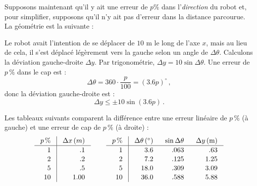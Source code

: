 {Supposons maintenant qu'il y ait une erreur de $p\%$ dans l'\emph{direction} du robot et, pour simplifier, supposons qu'il n'y ait pas d'erreur dans la distance parcourue. La géométrie est la suivante :

\begin{center}
\end{center}

Le robot avait l'intention de se déplacer de $10$ m le long de l'axe $x$, mais au lieu de cela, il s'est déplacé légèrement vers la gauche selon un angle de $\Delta \theta$. Calculons la déviation gauche-droite $\Delta y$. Par trigonométrie, $\Delta y = 10\sin \Delta\theta$. Une erreur de $p\,\%$ dans le cap est :
\[
\Delta\theta=360\cdot\frac{p}{100}=(3.6p)^\circ\,,
\]
donc la déviation gauche-droite est :
\[
\Delta y \leq \pm 10 \sin (3.6p)\,.
\]

Les tableaux suivants comparent la différence entre une erreur linéaire de $p\,\%$ (à gauche) et une erreur de cap de $p\,\%$ (à droite) :
\begin{displaymath}
\setlength{\arraycolsep}{2ex}
\renewcommand{\arraystretch}{1.1}
\begin{array}{r|r}
\multicolumn{1}{c|}{p\,\%} & \multicolumn{1}{c}{\Delta x \,(m)}\\\hline
1 & .1 \\
2 & .2 \\
5 & .5 \\
10 & 1.00\\
\end{array}
\;\;\;\;\;\;\;\;
\begin{array}{r|rrr}
\multicolumn{1}{c|}{p\,\%} & \multicolumn{1}{c}{\Delta \theta\,({}^\circ)} & \multicolumn{1}{c}{\sin\Delta\theta} & \multicolumn{1}{c}{\Delta y \,(\textrm{m})}\\\hline
1 & 3.6 & .063 & .63\\
2 & 7.2 & .125 & 1.25\\
5 & 18.0 & .309 & 3.09\\
10 & 36.0 & .588 & 5.88\\
\end{array}
\end{displaymath}

}
